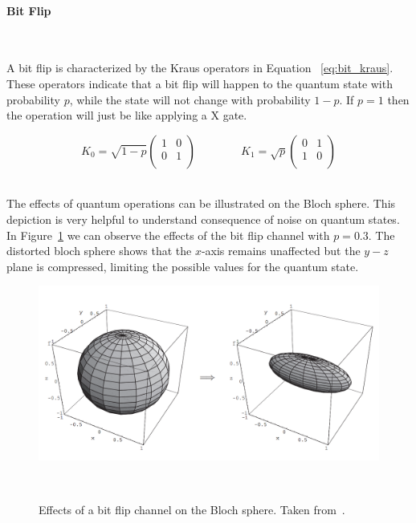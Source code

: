 \paragraph{Bit Flip} \

A bit flip is characterized by the Kraus operators in Equation
~\ref{eq:bit_kraus}. These operators indicate that a bit flip
will happen to the quantum state with probability \(p\), while
the state will not change with probability \(1-p\). If \(p=1\)
then the operation will just be like applying a X gate. \

\begin{equation}\label{eq:bit_kraus}
  K_0 = \sqrt{1-p} \begin{pmatrix}
          1 & 0 \\
          0 & 1 \\
        \end{pmatrix} \qquad \qquad
  K_1 = \sqrt{p} \begin{pmatrix}
          0 & 1 \\
          1 & 0 \\
        \end{pmatrix}
\end{equation} \

The effects of quantum operations can be illustrated on the Bloch sphere.
This depiction is very helpful to understand consequence of noise on
quantum states. In Figure~\ref{fig:bit_flip} we can observe the effects
of the bit flip channel with \(p=0.3\). The distorted bloch sphere shows
that the \(x\)-axis remains unaffected but the \(y-z\) plane is compressed,
limiting the possible values for the quantum state. \

\begin{figure}[h!]
  \includegraphics[scale=0.39]{figures/bit_flip.png}
  \centering
  \caption{Effects of a bit flip channel on the Bloch sphere. Taken from~\cite{nielsen_quantum_2010}.}
~\label{fig:bit_flip}
\end{figure} \

